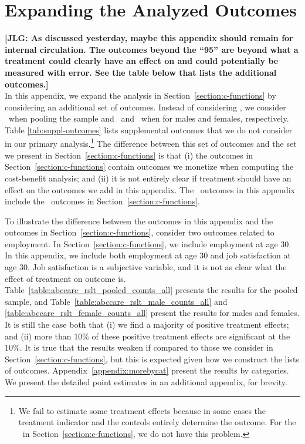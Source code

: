 \section{{Expanding the Analyzed Outcomes}} \label{appendix:moreoutcomes}

\noindent \textbf{[JLG: As discussed yesterday, maybe this appendix should remain for internal circulation. The outcomes beyond the ``95'' are beyond what a treatment could clearly have an effect on and could potentially be measured with error. See the table below that lists the additional outcomes.]} \\

\noindent In this appendix, we expand the analysis in Section~\ref{section:c-functions} by considering an additional set of outcomes. Instead of considering \noutcomes, we consider \noutcomesexpp\ when pooling the sample and \noutcomesexpm\ and \noutcomesexpf\ when for males and females, respectively. Table \ref{tab:suppl-outcomes} lists supplemental outcomes that we do not consider in our primary analysis.\footnote{We fail to estimate some treatment effects because in some cases the treatment indicator and the controls entirely determine the outcome. For the \noutcomes\ in Section~\ref{section:c-functions}, we do not have this problem.} The difference between this set of outcomes and the set we present in Section~\ref{section:c-functions} is that (i) the outcomes in Section~\ref{section:c-functions} contain outcomes we monetize when computing the cost-benefit analysis; and (ii) it is not entirely clear if treatment should have an effect on the outcomes we add in this appendix. The \noutcomesexpp\ outcomes in this appendix include the \noutcomes\ outcomes in Section~\ref{section:c-functions}.\\

\singlespacing

\doublespacing

\noindent To illustrate the difference between the outcomes in this appendix and the outcomes in Section~\ref{section:c-functions}, consider two outcomes related to employment. In Section~\ref{section:c-functions}, we include employment at age 30. In this appendix, we include both employment at age 30 and job satisfaction at age 30. Job satisfaction is a subjective variable, and it is not as clear what the effect of treatment on outcome is.\\

\noindent Table~\ref{table:abccare_rslt_pooled_counts_all} presents the results for the pooled sample, and Table~\ref{table:abccare_rslt_male_counts_all} and \ref{table:abccare_rslt_female_counts_all} present the results for males and females. It is still the case both that (i) we find a majority of positive treatment effects; and (ii) more than 10\% of these positive treatment effects are significant at the 10\%. It is true that the results weaken if compared to those we consider in Section~\ref{section:c-functions}, but this is expected given how we construct the lists of outcomes. Appendix~\ref{appendix:morebycat} present the results by categories. We present the detailed point estimates in an additional appendix, for brevity.

